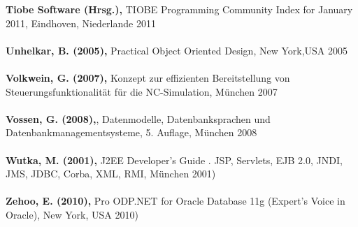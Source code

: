 \textbf{Tiobe Software (Hrsg.),} TIOBE Programming Community Index for January 2011, Eindhoven, Niederlande 2011\\\\
\textbf{Unhelkar, B. (2005),} Practical Object Oriented Design, New York,USA 2005\\\\
\textbf{Volkwein, G. (2007),} Konzept zur effizienten Bereitstellung von Steuerungsfunktionalität für die NC-Simulation, München 2007\\\\
\textbf{Vossen, G. (2008),}, Datenmodelle, Datenbanksprachen und Datenbankmanagementsysteme, 5. Auflage, München 2008\\\\
\textbf{Wutka, M. (2001),} J2EE Developer's Guide . JSP, Servlets, EJB 2.0, JNDI, JMS, JDBC, Corba, XML, RMI, München 2001)\\\\
\textbf{Zehoo, E. (2010),} Pro ODP.NET for Oracle Database 11g (Expert's Voice in Oracle), New York, USA 2010)\\\\



